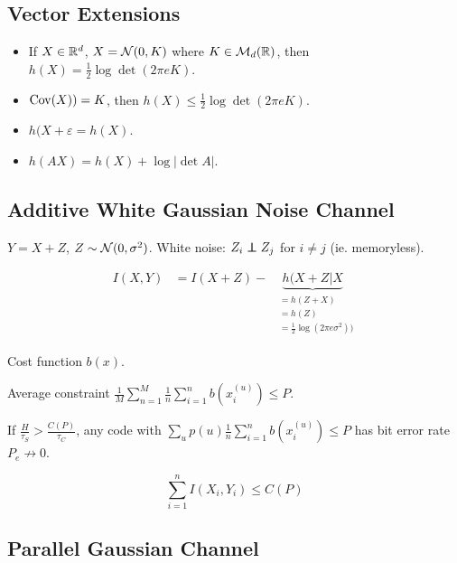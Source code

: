 \subsection{Vector Extensions}
\begin{itemize}
    \item If $X \in \mathbb{R}^d$, $X=\mathcal{N}(0, K)$ where $K \in \mathcal{M}_d(\mathbb{R})$, then $h(X) = \frac{1}{2}\log \det(2\pi e K)$.
    \item $\operatorname{Cov}(X)) = K$, then $h(X) \leqslant \frac{1}{2} \log \det (2\pi e K)$.
    \item $h(X+\varepsilon = h(X)$.
    \item $h(AX) = h(X) + \log \lvert\det A \rvert$.
\end{itemize}

\subsection{Additive White Gaussian Noise Channel}

$Y = X + Z$, $Z\sim \mathcal{N}(0,\sigma^2)$. White noise: $Z_i \perp\hspace{-7pt}\perp Z_j$ for $i\neq j$ (ie. memoryless).

\[
    \begin{aligned}
        I(X,Y) &= I(X+Z) - \underbrace{h(X+Z \vert X}_{\scriptscriptstyle\begin{aligned}
                &= h(Z + X)\\&=h(Z)\\&=\frac{1}{2}\log(2\pi e \sigma^2))
        \end{aligned}}
    \end{aligned}
\]

Cost function $b(x)$.

Average constraint $\frac{1}{M} \sum\limits_{n=1}^{M} \frac{1}{n} \sum\limits_{i=1}^n b(x_i^{(u)}) \leqslant P$.

\begin{theorem}
    If $\frac{H}{\tau_S} > \frac{C(P)}{\tau_C}$, any code  with $\sum\limits_u p(u) \frac{1}{n} \sum\limits_{i=1}^nb(x^{(u)}_i) \leqslant P$ has bit error rate $P_e \not\to 0$.
\end{theorem}

\begin{lemma}
    \[
        \sum\limits_{i=1}^n I(X_i, Y_i) \leqslant C(P)
    \]
\end{lemma}

\subsection{Parallel Gaussian Channel}

